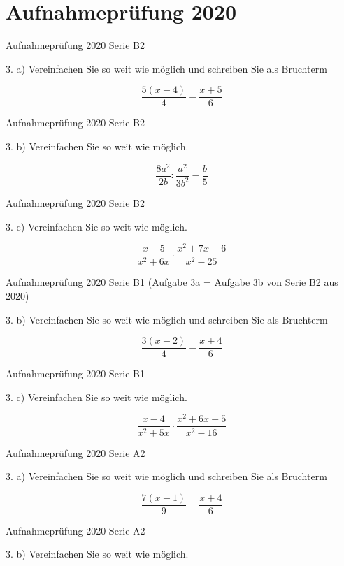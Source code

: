 \section*{Aufnahmeprüfung 2020}
Aufnahmeprüfung 2020 Serie B2

3. a) Vereinfachen Sie so weit wie möglich und schreiben Sie als Bruchterm

$$\frac{5(x-4)}{4} - \frac{x+5}{6}$$

Aufnahmeprüfung 2020 Serie B2

3. b) Vereinfachen Sie so weit wie möglich.

$$\frac{8a^2}{2b} : \frac{a^2}{3b^2} - \frac{b}{5}$$

Aufnahmeprüfung 2020 Serie B2

3. c) Vereinfachen Sie so weit wie möglich.

$$\frac{x-5}{x^2+6x} \cdot{} \frac{x^2+7x+6}{x^2-25}$$

Aufnahmeprüfung 2020 Serie B1
(Aufgabe 3a = Aufgabe 3b von Serie B2 aus 2020)

3. b) Vereinfachen Sie so weit wie möglich und schreiben Sie als Bruchterm

$$\frac{3(x-2)}{4} - \frac{x+4}{6}$$

Aufnahmeprüfung 2020 Serie B1

3. c) Vereinfachen Sie so weit wie möglich.

$$\frac{x-4}{x^2+5x} \cdot{} \frac{x^2+6x+5}{x^2-16}$$

Aufnahmeprüfung 2020 Serie A2

3. a) Vereinfachen Sie so weit wie möglich und schreiben Sie als Bruchterm

$$\frac{7(x-1)}{9} - \frac{x+4}{6}$$

Aufnahmeprüfung 2020 Serie A2

3. b) Vereinfachen Sie so weit wie möglich.

